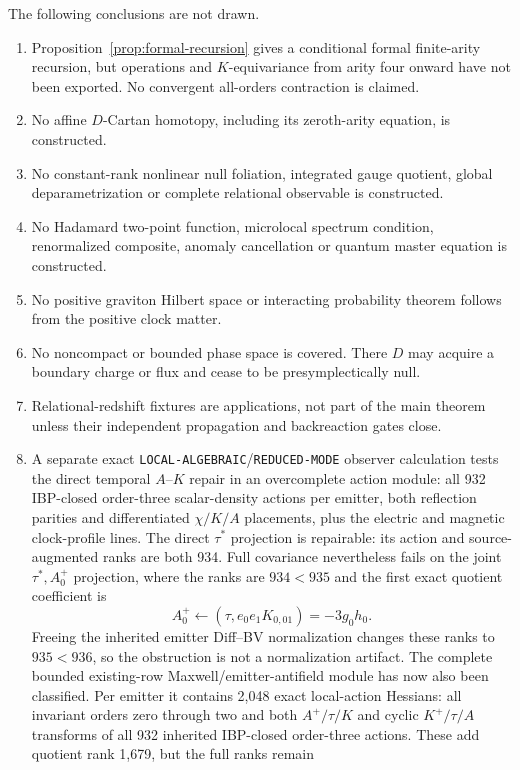 \documentclass[11pt]{article}
\theoremstyle{definition}
\theoremstyle{remark}
\begin{document}
The following conclusions are not drawn.
\begin{enumerate}
\item Proposition~\ref{prop:formal-recursion} gives a conditional formal
finite-arity recursion, but operations and $K$-equivariance from arity four
onward have not been exported.  No convergent all-orders contraction is
claimed.
\item No affine $D$-Cartan homotopy, including its zeroth-arity equation, is
constructed.
\item No constant-rank nonlinear null foliation, integrated gauge quotient,
global deparametrization or complete relational observable is constructed.
\item No Hadamard two-point function, microlocal spectrum condition,
renormalized composite, anomaly cancellation or quantum master equation is
constructed.
\item No positive graviton Hilbert space or interacting probability theorem
follows from the positive clock matter.
\item No noncompact or bounded phase space is covered.  There $D$ may acquire
a boundary charge or flux and cease to be presymplectically null.
\item Relational-redshift fixtures are applications, not part of the main
theorem unless their independent propagation and backreaction gates close.
\item A separate exact \texttt{LOCAL-ALGEBRAIC}/\texttt{REDUCED-MODE}
observer calculation tests the direct temporal \(A\)--\(K\) repair in an
overcomplete action module: all 932 IBP-closed order-three scalar-density
actions per emitter, both reflection parities and differentiated
\(\chi/K/A\) placements, plus the electric and magnetic clock-profile
lines.  The direct \(\tau^*\) projection is repairable: its action and
source-augmented ranks are both 934.  Full covariance nevertheless fails on
the joint \(\tau^*,A^+_0\) projection, where the ranks are \(934<935\) and
the first exact quotient coefficient is
\[
 A^+_0\leftarrow(\tau,e_0e_1K_{0,01})=-3g_0h_0 .
\]
Freeing the inherited emitter Diff--BV normalization changes these ranks to
\(935<936\), so the obstruction is not a normalization artifact.  The
complete bounded existing-row Maxwell/emitter-antifield module has now also
been classified.  Per emitter it contains 2,048 exact local-action Hessians:
all invariant orders zero through two and both \(A^+/\tau/K\) and cyclic
\(K^+/\tau/A\) transforms of all 932 inherited IBP-closed order-three
actions.  These add quotient rank 1,679, but the full ranks remain

\end{enumerate}
\end{document}
